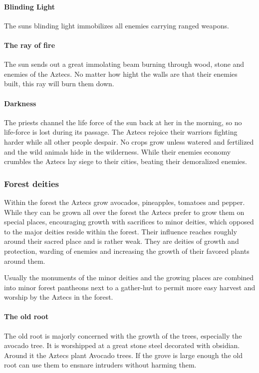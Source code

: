 \documentclass[a4paper]{book}
\begin{document}
			\paragraph{Blinding Light}
				The suns blinding light immobilizes all enemies carrying ranged weapons.

			\paragraph{The ray of fire}
				The sun sends out a great immolating beam burning through wood, stone and enemies
				of the \gls{Aztecs}.
				No matter how hight the walls are that their enemies built,
				this ray will burn them down.

			\paragraph{Darkness}
				The priests channel the life force of the sun back at her in the morning,
				so no life-force is lost during its passage.
				The \gls{Aztecs} rejoice their warriors fighting harder while all other people
				despair.
				No crops grow unless watered and fertilized and the wild animals hide in the wilderness.
				While their enemies economy crumbles the \gls{Aztecs} lay siege to their cities,
				beating their demoralized enemies.

		\subsubsection{Forest deities}
			Within the forest the \gls{Aztecs} grow avocados, pineapples, tomatoes and pepper.
			While they can be grown all over the forest the \gls{Aztecs} prefer to grow
			them on special places, encouraging growth with sacrifices to minor deities,
			which opposed to the major deities reside within the forest.
			Their influence reaches roughly around their sacred place and is rather weak.
			They are deities of growth and protection, warding of enemies and increasing
			the growth of their favored plants around them.

			Usually the monuments of the minor deities and the growing places are combined
			into minor forest pantheons next to a gather-hut to permit more easy harvest
			and worship by the \gls{Aztecs} in the forest.

			\paragraph{The old root}
				The old root is majorly concerned with the growth of the trees, especially the avocado tree.
				It is worshipped at a great stone steel decorated with obsidian.
				Around it the \gls{Aztecs} plant Avocado trees.
				If the grove is large enough the old root can use them to ensnare
				intruders without harming them.
\end{document}
